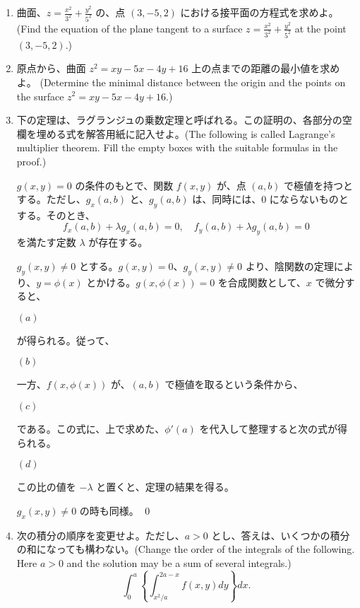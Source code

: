 \begin{enumerate}
\item 曲面、${\displaystyle z = \frac{x^2}{3^2} + \frac{y^2}{5^2}}$ の、点 $(3,-5,2)$ における接平面の方程式を求めよ。(Find the equation of the plane tangent to a surface 
${\displaystyle z = \frac{x^2}{3^2} + \frac{y^2}{5^2}}$ at the point $(3,-5,2)$.)

\item 原点から、曲面 $z^2 = xy - 5x - 4y + 16$ 上の点までの距離の最小値を求めよ。
(Determine the minimal distance between the origin and the points on the surface 
$z^2 = xy - 5x - 4y + 16$.)

\item 下の定理は、ラグランジュの乗数定理と呼ばれる。この証明の、各部分の空欄を埋める式を解答用紙に記入せよ。(The following is called Lagrange's multiplier theorem. Fill the empty boxes with the suitable formulas in the proof.)
\begin{thm}
$g(x,y) = 0$ の条件のもとで、関数 $f(x,y)$ が、点 $(a,b)$ で極値を持つとする。ただし、$g_x(a,b)$ と、$g_y(a,b)$ は、同時には、$0$ にならないものとする。そのとき、
$$f_x(a,b) + \lambda g_x(a,b) = 0,\quad f_y(a,b) + \lambda g_y(a,b) = 0$$
を満たす定数 $\lambda$ が存在する。
\end{thm}
\proof
$g_y(x,y) \neq 0$ とする。$g(x,y) = 0$、$g_y(x,y) \neq 0$ より、陰関数の定理により、$y = \phi(x)$ とかける。$g(x,\phi(x)) = 0$  を合成関数として、$x$ で微分すると、

$(a)$ \framebox[10cm][l]{\rule[-0.3cm]{0cm}{0.7cm}}

が得られる。従って、

$(b)$ 

一方、$f(x,\phi(x))$ が、$(a,b)$ で極値を取るという条件から、

$(c)$ \framebox[10cm][l]{\rule[-0.3cm]{0cm}{0.7cm}}

である。この式に、上で求めた、$\phi'(a)$  を代入して整理すると次の式が得られる。

$(d)$ \framebox[10cm][l]{\rule[-0.3cm]{0cm}{0.7cm}}

この比の値を $-\lambda$ と置くと、定理の結果を得る。

$g_x(x,y) \neq 0$ の時も同様。
\qed

\item 次の積分の順序を変更せよ。ただし、$a>0$ とし、答えは、いくつかの積分の和になっても構わない。(Change the order of the integrals of the following.  Here $a>0$ and the solution may be a sum of several integrals.)
$$\int^a_0\left\{\int^{2a - x}_{x^2/a}f(x,y)dy\right\}dx.$$


\end{enumerate}
